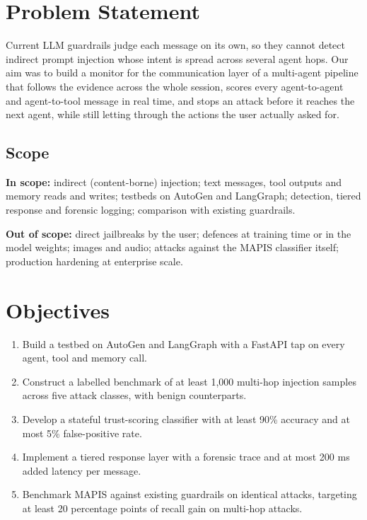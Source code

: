 \section{Problem Statement}
Current LLM guardrails judge each message on its own, so they cannot detect indirect prompt injection whose intent is spread across several agent hops. Our aim was to build a monitor for the communication layer of a multi-agent pipeline that follows the evidence across the whole session, scores every agent-to-agent and agent-to-tool message in real time, and stops an attack before it reaches the next agent, while still letting through the actions the user actually asked for.

\subsection{Scope}
\textbf{In scope:} indirect (content-borne) injection; text messages, tool outputs and memory reads and writes; testbeds on AutoGen and LangGraph; detection, tiered response and forensic logging; comparison with existing guardrails.

\textbf{Out of scope:} direct jailbreaks by the user; defences at training time or in the model weights; images and audio; attacks against the MAPIS classifier itself; production hardening at enterprise scale.

\section{Objectives}
\begin{enumerate}
\item[O1] Build a testbed on AutoGen and LangGraph with a FastAPI tap on every agent, tool and memory call.
\item[O2] Construct a labelled benchmark of at least 1,000 multi-hop injection samples across five attack classes, with benign counterparts.
\item[O3] Develop a stateful trust-scoring classifier with at least 90\% accuracy and at most 5\% false-positive rate.
\item[O4] Implement a tiered response layer with a forensic trace and at most 200 ms added latency per message.
\item[O5] Benchmark MAPIS against existing guardrails on identical attacks, targeting at least 20 percentage points of recall gain on multi-hop attacks.
\end{enumerate}


